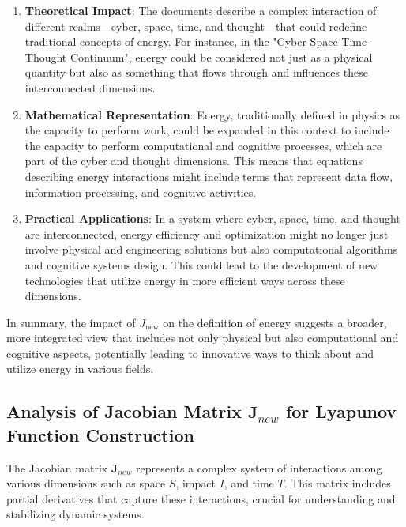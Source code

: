 \documentclass{article}
\begin{document}
\begin{enumerate}
    \item \textbf{Theoretical Impact}: The documents describe a complex interaction of different realms---cyber, space, time, and thought---that could redefine traditional concepts of energy. For instance, in the "Cyber-Space-Time-Thought Continuum", energy could be considered not just as a physical quantity but also as something that flows through and influences these interconnected dimensions.

    \item \textbf{Mathematical Representation}: Energy, traditionally defined in physics as the capacity to perform work, could be expanded in this context to include the capacity to perform computational and cognitive processes, which are part of the cyber and thought dimensions. This means that equations describing energy interactions might include terms that represent data flow, information processing, and cognitive activities.

    \item \textbf{Practical Applications}: In a system where cyber, space, time, and thought are interconnected, energy efficiency and optimization might no longer just involve physical and engineering solutions but also computational algorithms and cognitive systems design. This could lead to the development of new technologies that utilize energy in more efficient ways across these dimensions.
\end{enumerate}

In summary, the impact of $J_{\text{new}}$ on the definition of energy suggests a broader, more integrated view that includes not only physical but also computational and cognitive aspects, potentially leading to innovative ways to think about and utilize energy in various fields.
\subsection*{Analysis of Jacobian Matrix \(\mathbf{J}_{new}\) for Lyapunov Function Construction}

The Jacobian matrix \(\mathbf{J}_{new}\) represents a complex system of interactions among various dimensions such as space \(S\), impact \(I\), and time \(T\). This matrix includes partial derivatives that capture these interactions, crucial for understanding and stabilizing dynamic systems.
\end{document}
